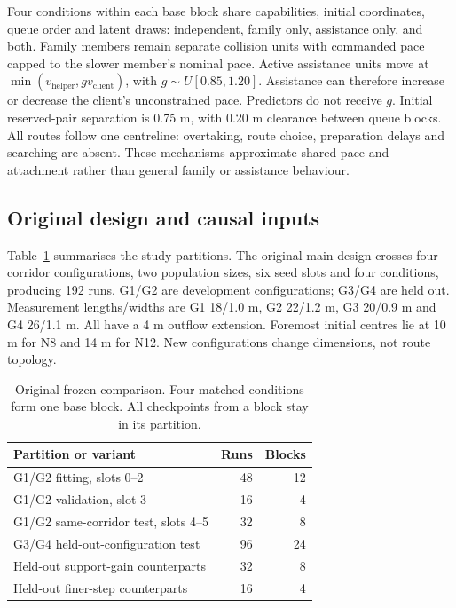 \documentclass[conference]{IEEEtran}
\begin{document}
Four conditions within each base block share capabilities, initial coordinates, queue order and latent draws: independent, family only, assistance only, and both. Family members remain separate collision units with commanded pace capped to the slower member's nominal pace. Active assistance units move at $\min(v_{\mathrm{helper}},g v_{\mathrm{client}})$, with $g\sim U[0.85,1.20]$. Assistance can therefore increase or decrease the client's unconstrained pace. Predictors do not receive $g$. Initial reserved-pair separation is 0.75 m, with 0.20 m clearance between queue blocks. All routes follow one centreline: overtaking, route choice, preparation delays and searching are absent. These mechanisms approximate shared pace and attachment rather than general family or assistance behaviour.

\subsection{Original design and causal inputs}
Table~\ref{tab:design} summarises the study partitions. The original main design crosses four corridor configurations, two population sizes, six seed slots and four conditions, producing 192 runs. G1/G2 are development configurations; G3/G4 are held out. Measurement lengths/widths are G1 18/1.0 m, G2 22/1.2 m, G3 20/0.9 m and G4 26/1.1 m. All have a 4 m outflow extension. Foremost initial centres lie at 10 m for N8 and 14 m for N12. New configurations change dimensions, not route topology.

\begin{table}[!t]\centering\small
\caption{Original frozen comparison. Four matched conditions form one base block. All checkpoints from a block stay in its partition.}
\label{tab:design}
\begin{tabular}{lrr}\toprule Partition or variant & Runs & Blocks\\\midrule
G1/G2 fitting, slots 0--2 & 48 & 12\\
G1/G2 validation, slot 3 & 16 & 4\\
G1/G2 same-corridor test, slots 4--5 & 32 & 8\\
G3/G4 held-out-configuration test & 96 & 24\\
Held-out support-gain counterparts & 32 & 8\\
Held-out finer-step counterparts & 16 & 4\\\bottomrule
\end{tabular}
\end{table}
\end{document}
